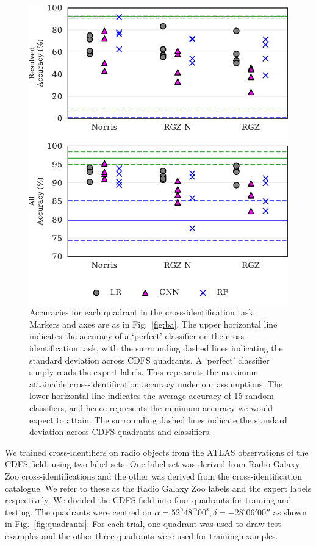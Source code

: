 \documentclass[fleqn,usenatbib,usedcolumn]{mnras}
\begin{document}
  \begin{figure}
    \centering
    \includegraphics[width=\columnwidth]{images/cdfs_cross_identification_grid.pdf}
    \caption{Accuracies for each quadrant in the cross-identification
      task. Markers and axes are as in Fig.~\ref{fig:ba}. The upper horizontal line
      indicates the accuracy of a `perfect' classifier on the cross-identification
      task, with the surrounding dashed lines indicating the standard deviation
      across CDFS quadrants. A `perfect' classifier simply reads the expert
      labels. This represents the maximum attainable cross-identification accuracy
      under our assumptions. The lower horizontal line indicates the average
      accuracy of 15 random classifiers, and hence represents the minimum accuracy
      we would expect to attain. The surrounding dashed lines indicate the
      standard deviation across CDFS quadrants and classifiers.
      \label{fig:cross-id-accuracy}}
  \end{figure}

    We trained cross-identifiers on radio objects from the ATLAS observations of
    the CDFS field, using two label sets. One label set was derived from Radio
    Galaxy Zoo cross-identifications and the other was derived from the
    \citet{norris06} cross-identification catalogue. We refer to these as the
    Radio Galaxy Zoo labels and the expert labels respectively. We divided the
    CDFS field into four quadrants for training and testing. The quadrants were
    centred on $\alpha = 52^\text{h}48^\text{m}00^\text{s},
    \delta = -28^\circ{}06'00''$ as shown in Fig.~\ref{fig:quadrants}. For
    each trial, one quadrant was used to draw test examples and the other three
    quadrants were used for training examples.
\end{document}
